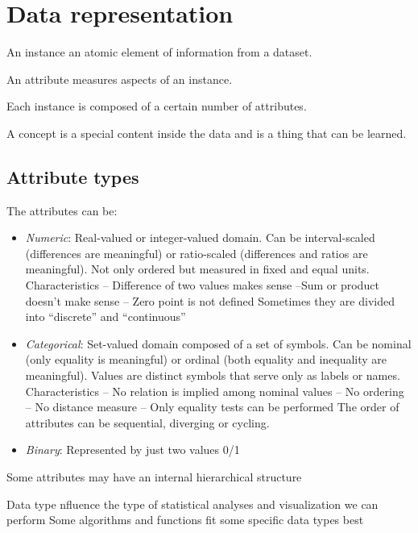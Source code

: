 \section{Data representation}

\begin{definition}
    An instance an atomic element of information from a dataset. 
\end{definition}
\begin{definition}
    An attribute measures aspects of an instance.
\end{definition}
\noindent Each instance is composed of a certain number of attributes. 
\begin{definition}
    A concept is a special content inside the data and is a thing that can be learned. 
\end{definition}

\subsection{Attribute types}
The attributes can be: 
\begin{itemize}
    \item \textit{Numeric}: Real-valued or integer-valued domain. 
        Can be interval-scaled (differences are meaningful) or ratio-scaled (differences and ratios are meaningful). 
        Not only ordered but measured in fixed and equal units. Characteristics
        – Difference of two values makes sense
        –Sum or product doesn’t make sense
        – Zero point is not defined
        Sometimes they are divided into “discrete” and “continuous”
    \item \textit{Categorical}: Set-valued domain composed of a set of symbols. 
        Can be nominal (only equality is meaningful) or ordinal (both equality and inequality are meaningful).
        Values are distinct symbols that serve only as labels or names. 
        Characteristics
        – No relation is implied among nominal values
        – No ordering
        – No distance measure
        – Only equality tests can be performed
        The order of attributes can be sequential, diverging or cycling. 
    \item \textit{Binary}: Represented by just two values 0/1
\end{itemize}
\noindent Some attributes may have an internal hierarchical structure

Data type nfluence the type of statistical analyses
and visualization we can perform
Some algorithms and functions
fit some specific data types best

